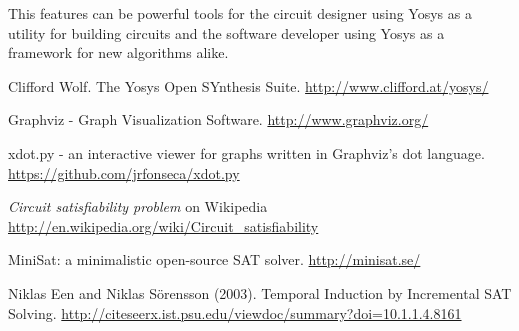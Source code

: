 \documentclass[9pt,technote,a4paper]{IEEEtran}
\begin{document}
This features can be powerful tools for the circuit designer using Yosys as a
utility for building circuits and the software developer using Yosys as a
framework for new algorithms alike.

\begin{thebibliography}{9}

Clifford Wolf. The Yosys Open SYnthesis Suite.
\url{http://www.clifford.at/yosys/}

Graphviz - Graph Visualization Software.
\url{http://www.graphviz.org/}

xdot.py - an interactive viewer for graphs written in Graphviz's dot language.
\url{https://github.com/jrfonseca/xdot.py}

{\it Circuit satisfiability problem} on Wikipedia
\url{http://en.wikipedia.org/wiki/Circuit_satisfiability}

MiniSat: a minimalistic open-source SAT solver.
\url{http://minisat.se/}

Niklas Een and Niklas S\"orensson (2003).
Temporal Induction by Incremental SAT Solving.
\url{http://citeseerx.ist.psu.edu/viewdoc/summary?doi=10.1.1.4.8161}

\end{thebibliography}
\end{document}
